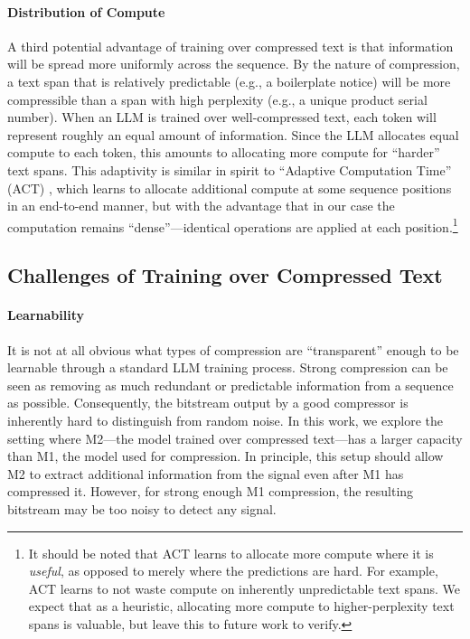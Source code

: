 \paragraph{Distribution of Compute} A third potential advantage of training over compressed text is that information will be spread more uniformly across the sequence. By the nature of compression, a text span that is relatively predictable (e.g., a boilerplate notice) will be more compressible than a span with high perplexity (e.g., a unique product serial number). When an LLM is trained over well-compressed text, each token will represent roughly an equal amount of information. Since the LLM allocates equal compute to each token, this amounts to allocating more compute for ``harder'' text spans. This adaptivity is similar in spirit to ``Adaptive Computation Time'' (ACT) \cite{gravesAdaptiveComputationTime2017}, which learns to allocate additional compute at some sequence positions in an end-to-end manner, but with the advantage that in our case the computation remains ``dense''---identical operations are applied at each position.\footnote{It should be noted that ACT learns to allocate more compute where it is \emph{useful}, as opposed to merely where the predictions are hard. For example, ACT learns to not waste compute on inherently unpredictable text spans. We expect that as a heuristic, allocating more compute to higher-perplexity text spans is valuable, but leave this to future work to verify.}

\subsection{Challenges of Training over Compressed Text}
\label{sec:challenges}

\paragraph{Learnability} It is not at all obvious what types of compression are ``transparent'' enough to be learnable through a standard LLM training process. Strong compression can be seen as removing as much redundant or predictable information from a sequence as possible. Consequently, the bitstream output by a good compressor is inherently hard to distinguish from random noise. In this work, we explore the setting where M2---the model trained over compressed text---has a larger capacity than M1, the model used for compression. In principle, this setup should allow M2 to extract additional information from the signal even after M1 has compressed it. However, for strong enough M1 compression, the resulting bitstream may be too noisy to detect any signal.

